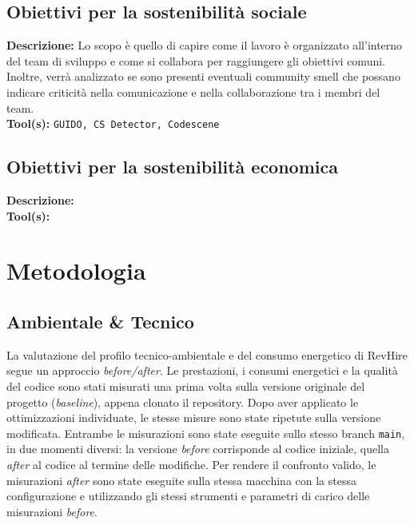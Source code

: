 \documentclass[12pt,a4paper]{article}
\begin{document}
    \subsection{Obiettivi per la sostenibilità sociale}
    \begin{description}[style=nextline, leftmargin=1em, itemsep=1em]
    \item[G5 -- Analisi delle dinamiche organizzative e collaborative del team di sviluppo]
    \textbf{Descrizione:} Lo scopo è quello di capire come il lavoro è organizzato all'interno del team di sviluppo e come si collabora per raggiungere gli obiettivi comuni. \\
    Inoltre, verrà analizzato se sono presenti eventuali community smell che possano indicare criticità nella comunicazione e nella collaborazione tra i membri del team. \\
    \textbf{Tool(s):} \texttt{GUIDO, CS Detector, Codescene}
    \end{description}



    \subsection{Obiettivi per la sostenibilità economica}
    \begin{description}[style=nextline, leftmargin=1em, itemsep=1em]
    \item[G6 -- TODO ]
    \textbf{Descrizione:}  \\
    \textbf{Tool(s):} \texttt{}
    \end{description}

    \section{Metodologia}

    \subsection{Ambientale \& Tecnico}
    La valutazione del profilo tecnico-ambientale e del consumo energetico di RevHire
    segue un approccio \emph{before/after}. Le prestazioni, i consumi energetici
    e la qualità del codice sono stati misurati una prima volta sulla versione
    originale del progetto (\emph{baseline}), appena clonato il repository.
    Dopo aver applicato le ottimizzazioni individuate, le stesse misure sono
    state ripetute sulla versione modificata. Entrambe le misurazioni sono state
    eseguite sullo stesso branch \texttt{main}, in due momenti diversi: la
    versione \emph{before} corrisponde al codice iniziale, quella \emph{after}
    al codice al termine delle modifiche. Per rendere il confronto valido, le
    misurazioni \textit{after} sono state eseguite sulla stessa macchina con la stessa configurazione
    e utilizzando gli stessi strumenti e parametri di carico delle misurazioni \textit{before}.
\end{document}
